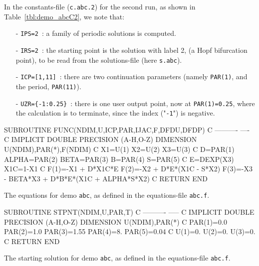 \documentclass[12pt]{report}
\begin{document}
In the constants-file ({\tt c.abc.2}) for the second run, as shown in 
Table~\ref{tbl:demo_abcC2}, we note that:

\begin{itemize}
\item[-] {\tt IPS=2}~: a family of periodic solutions is computed.

\item[-] {\tt IRS=2}~: the starting point is the solution with label 2,
         (a Hopf bifurcation point), to be read from the solutions-file 
	 (here {\tt s.abc}).

\item[-] {\tt ICP=[1,11]}~: there are two continuation parameters
	 (namely {\tt PAR(1)}, and the period, {\tt PAR(11)}). 

\item[-] {\tt UZR=\{-1:0.25\}}~: there is one user output point, now at
	 {\tt PAR(1)=0.25}, where the calculation is to terminate,
	 since the index ("{\tt -1}") is negative.
\end{itemize}

\begin{table}[htbp]
{\small
\begin{center}
\begin{boxedverbatim}
      SUBROUTINE FUNC(NDIM,U,ICP,PAR,IJAC,F,DFDU,DFDP)
C     ---------- ----
C
      IMPLICIT DOUBLE PRECISION (A-H,O-Z)
      DIMENSION U(NDIM),PAR(*),F(NDIM)
C
       X1=U(1)
       X2=U(2)
       X3=U(3)
C
       D=PAR(1)
       ALPHA=PAR(2)
       BETA=PAR(3)
       B=PAR(4)
       S=PAR(5)
C
       E=DEXP(X3)
       X1C=1-X1
C
       F(1)=-X1 + D*X1C*E
       F(2)=-X2 + D*E*(X1C - S*X2)
       F(3)=-X3 - BETA*X3 + D*B*E*(X1C + ALPHA*S*X2)
C
      RETURN
      END
\end{boxedverbatim}
\end{center}
}
\caption{The equations for demo {\tt abc}, 
as defined in the equations-file {\tt abc.f}.}
\label{tbl:demo_abcE1}
\end{table}


\begin{table}[htbp]
{\small
\begin{center}
\begin{boxedverbatim}
      SUBROUTINE STPNT(NDIM,U,PAR,T)
C     ---------- -----
C
      IMPLICIT DOUBLE PRECISION (A-H,O-Z)
      DIMENSION U(NDIM),PAR(*)
C
       PAR(1)=0.0
       PAR(2)=1.0
       PAR(3)=1.55
       PAR(4)=8.
       PAR(5)=0.04
C
       U(1)=0.
       U(2)=0.
       U(3)=0.
C
      RETURN
      END
\end{boxedverbatim}
\end{center}
}
\caption{The starting solution for demo {\tt abc}, 
as defined in the equations-file {\tt abc.f}.}
\label{tbl:demo_abcE2}
\end{table}
\end{document}
